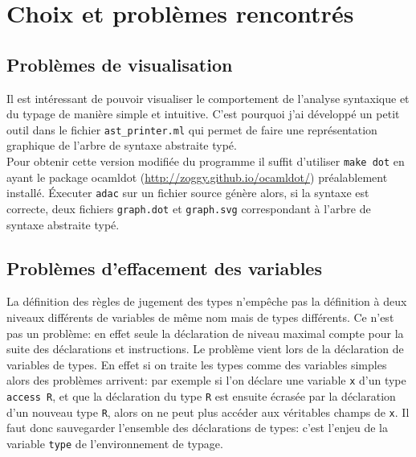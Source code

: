 \documentclass{article}
\begin{document}
  \section{Choix et problèmes rencontrés}
  \subsection{Problèmes de visualisation}
  Il est intéressant de pouvoir visualiser le comportement de l'analyse syntaxique et du typage de manière simple et intuitive.
  C'est pourquoi j'ai développé un petit outil dans le fichier \texttt{ast\_printer.ml} qui permet de faire une représentation graphique de l'arbre de syntaxe abstraite typé. \\
  Pour obtenir cette version modifiée du programme il suffit d'utiliser \texttt{make dot} en ayant le package ocamldot (\url{http://zoggy.github.io/ocamldot/}) préalablement installé.
  Éxecuter \texttt{adac} sur un fichier source génère alors, si la syntaxe est correcte, deux fichiers \texttt{graph.dot} et \texttt{graph.svg} correspondant à l'arbre de syntaxe abstraite typé.
  \subsection{Problèmes d'effacement des variables}
  La définition des règles de jugement des types n'empêche pas la définition à deux niveaux différents de variables de même nom mais de types différents.
  Ce n'est pas un problème: en effet seule la déclaration de niveau maximal compte pour la suite des déclarations et instructions.
  Le problème vient lors de la déclaration de variables de types. En effet si on traite les types comme des variables simples alors des problèmes arrivent:
  par exemple si l'on déclare une variable \texttt{x} d'un type \texttt{access R}, et que la déclaration du type \texttt{R} est ensuite écrasée par la déclaration d'un nouveau type \texttt{R}, alors on ne peut plus accéder aux véritables champs de \texttt{x}.
  Il faut donc sauvegarder l'ensemble des déclarations de types: c'est l'enjeu de la variable \texttt{type} de l'environnement de typage.
\end{document}

